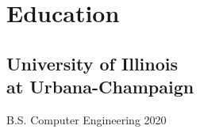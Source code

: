 \documentclass[9pt]{extarticle}
\newcommand\HUGE{\fontsize{24}{29}\selectfont}
\renewcommand{\maketitle}{
    \begin{center}
        {\HUGE\bfseries
        \theauthor}
        \vspace{2em}
    \end{center}
}
\begin{document}
\author{David Choo}
\maketitle


\begin{minipage}[t]{.25\textwidth}
    \section{Education}
    \vspace{0.5em}
    \subsection{University of Illinois\\at Urbana-Champaign}
    \vspace{0.5em}
    B.S. Computer Engineering 2020 \\


\end{minipage}
\end{document}
